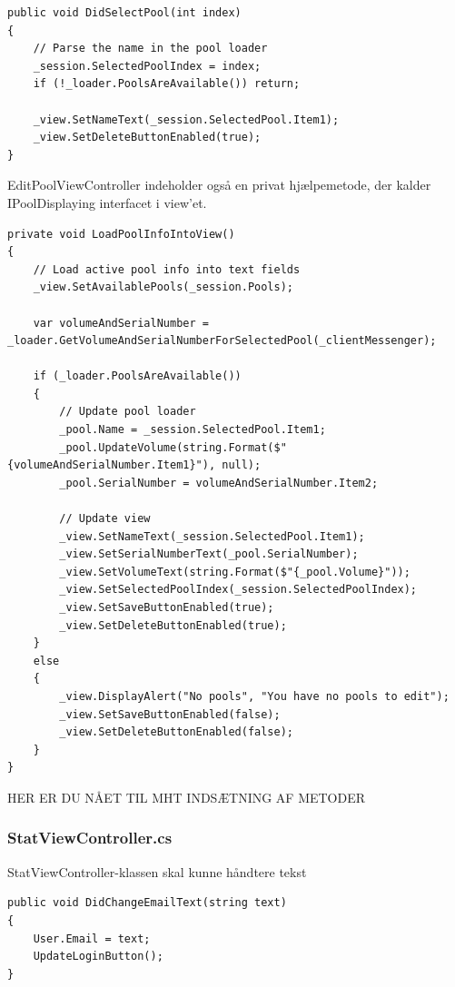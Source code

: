 \begin{lstlisting}[caption={DidSelectPool(...)},label={code:application_impl_pcdsp}]
public void DidSelectPool(int index)
{
	// Parse the name in the pool loader 
	_session.SelectedPoolIndex = index;
	if (!_loader.PoolsAreAvailable()) return;

	_view.SetNameText(_session.SelectedPool.Item1);
	_view.SetDeleteButtonEnabled(true);
}
\end{lstlisting}

EditPoolViewController indeholder også en privat hjælpemetode, der kalder IPoolDisplaying interfacet i view'et.

\begin{lstlisting}[caption={LoadPoolInfoIntoView(...)},label={code:application_impl_pcdlpiiv}]
private void LoadPoolInfoIntoView()
{
	// Load active pool info into text fields
	_view.SetAvailablePools(_session.Pools);

	var volumeAndSerialNumber = _loader.GetVolumeAndSerialNumberForSelectedPool(_clientMessenger);

	if (_loader.PoolsAreAvailable())
	{
		// Update pool loader
		_pool.Name = _session.SelectedPool.Item1;
		_pool.UpdateVolume(string.Format($"{volumeAndSerialNumber.Item1}"), null);
		_pool.SerialNumber = volumeAndSerialNumber.Item2;

		// Update view
		_view.SetNameText(_session.SelectedPool.Item1);
		_view.SetSerialNumberText(_pool.SerialNumber);
		_view.SetVolumeText(string.Format($"{_pool.Volume}"));
		_view.SetSelectedPoolIndex(_session.SelectedPoolIndex);
		_view.SetSaveButtonEnabled(true);
		_view.SetDeleteButtonEnabled(true);
	}
	else
	{
		_view.DisplayAlert("No pools", "You have no pools to edit");
		_view.SetSaveButtonEnabled(false);
		_view.SetDeleteButtonEnabled(false);
	}
}
\end{lstlisting}

HER ER DU NÅET TIL MHT INDSÆTNING AF METODER

\subsubsection{StatViewController.cs}
StatViewController-klassen skal kunne håndtere tekst

\begin{lstlisting}[caption={DidChangeEmailText(...)},label={code:application_impl_lvcdcet}]
public void DidChangeEmailText(string text)
{
	User.Email = text;
	UpdateLoginButton();
}
\end{lstlisting}

